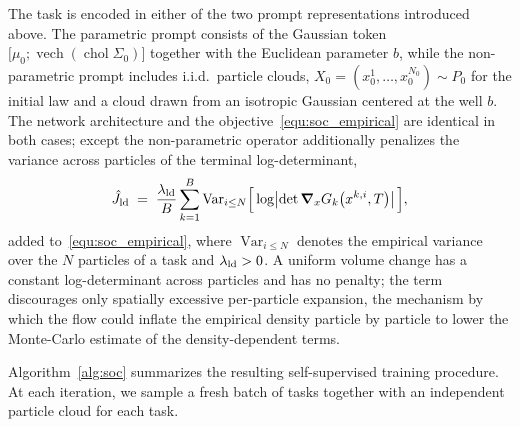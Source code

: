 \documentclass[preprint]{elsarticle}
\newcommand{\qb}[1]{\bigl(#1\bigr)}          %
\begin{document}
The task is encoded in either of the two prompt representations introduced above. The parametric prompt consists of the Gaussian token $\bigl[\mu_0;\operatorname{vech}(\operatorname{chol}\Sigma_0)\bigr]$ together with the Euclidean parameter $b$, while the non-parametric prompt includes i.i.d.\ particle clouds, $X_0=(x_0^1,\ldots,x_0^{N_0})\sim P_0$ for the initial law and a cloud drawn from an isotropic Gaussian centered at the well $b$. 
The network architecture and the objective~\eqref{equ:soc_empirical} are identical in both cases; except the non-parametric operator additionally penalizes the variance across particles of the terminal log-determinant,
\begin{align}
\hat J_{\rm ld}
\;=\;
\frac{\lambda_{\rm ld}}{B}\sum_{k=1}^{B}
\operatorname{Var}_{i\le N}
\Bigl[\,
\log\bigl|\det\boldsymbol{\nabla}_xG_k\qb{x^{k,i},T}\bigr|
\,\Bigr],
\label{equ:ld_penalty}
\end{align}
added to~\eqref{equ:soc_empirical}, where $\operatorname{Var}_{i\le N}$ denotes the empirical variance over the $N$ particles of a task and $\lambda_{\rm ld}>0$. A uniform volume change has a constant log-determinant across particles and has no penalty; the term discourages only spatially excessive per-particle expansion, the mechanism by which the flow could inflate the empirical density particle by particle to lower the Monte-Carlo estimate of the density-dependent terms.

Algorithm~\ref{alg:soc} summarizes the resulting self-supervised training procedure. At each iteration, we sample a fresh batch of tasks together with an independent particle cloud for each task.
\end{document}
